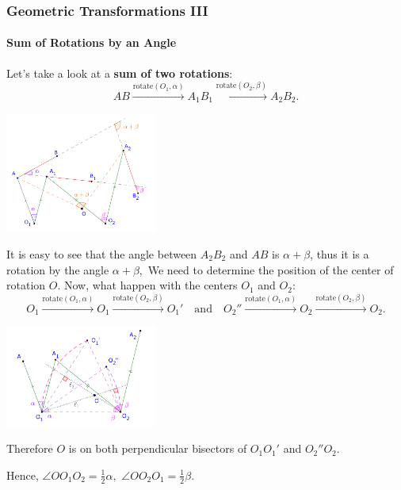 \documentclass[8pt,xcolor=table,dvipsnames]{beamer}
\providecommand{\half}{\frac{1}{2}}
\begin{document}
\begin{frame}[t]
    \frametitle{Geometric Transformations III}
    \framesubtitle{Sum of Rotations by an Angle}
    \begin{overprint}
        Let's take a look at a \textbf{sum of two rotations}:
        \[
            AB \stackrel{\text{rotate}(O_1, \alpha)}{\rightarrow} A_1B_1 \stackrel{\text{rotate}(O_2, \beta)}{\rightarrow} A_2B_2.
        \]
        \begin{center}
            \includegraphics[width=5cm]{./svg/pdf/sum-rotations-1.pdf}
        \end{center}

        It is easy to see that the angle between $A_2B_2$ and $AB$ is $\alpha + \beta$, thus it is a rotation by the angle $\alpha + \beta,$
        We need to determine the position of the center of rotation $O$.
        Now, what happen with the centers $O_1$ and $O_2$:
        \[
            O_1 \stackrel{\text{rotate}(O_1, \alpha)}{\rightarrow} O_1 \stackrel{\text{rotate}(O_2, \beta)}{\rightarrow} O_1'
            \quad \text{and} \quad O_2'' \stackrel{\text{rotate}(O_1, \alpha)}{\rightarrow} O_2 \stackrel{\text{rotate}(O_2, \beta)}{\rightarrow} O_2.
        \]
        \begin{center}
            \includegraphics[width=5cm]{./svg/pdf/sum-rotations-2.pdf}
        \end{center}
        Therefore $O$ is on both perpendicular bisectors of $O_1O_1'$ and $O_2''O_2$.

        \bigbreak        
        Hence, $\angle OO_1O_2 = \half \alpha,$  $\angle OO_2O_1 = \half \beta.$
    \end{overprint}
\end{frame}
\end{document}
